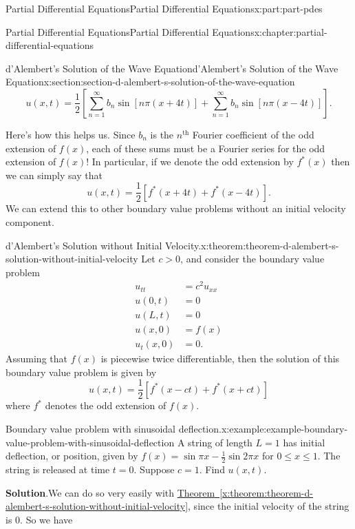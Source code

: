 \documentclass[oneside,10pt,]{book}
\newcommand{\blocktitlefont}{\relax}
\newcommand{\xreffont}{\relax}
\numberwithin{equation}{part}
\renewcommand{\th}{\text{th}}
\newcommand{\gt}{>}
\newcommand{\amp}{&}
\begin{document}
\begin{partptx}{Partial Differential Equations}{}{Partial Differential Equations}{}{}{x:part:part-pdes}
\begin{chapterptx}{Partial Differential Equations}{}{Partial Differential Equations}{}{}{x:chapter:partial-differential-equations}
\begin{sectionptx}{d'Alembert's Solution of the Wave Equation}{}{d'Alembert's Solution of the Wave Equation}{}{}{x:section:section-d-alembert-s-solution-of-the-wave-equation}
\begin{equation*}
u(x,t) = \frac{1}{2}\left[\sum_{n=1}^{\infty}b_{n}\sin[n\pi(x+4t)] + \sum_{n=1}^{\infty}b_{n}\sin[n\pi(x-4t)]\right].
\end{equation*}
%
\par
Here's how this helps us. Since \(b_{n}\) is the \(n^{\th}\) Fourier coefficient of the odd extension of \(f(x)\), each of these sums must be a Fourier series for the odd extension of \(f(x)\)! In particular, if we denote the odd extension by \(f^{*}(x)\) then we can simply say that%
%
\begin{equation*}
u(x,t) = \frac{1}{2}[f^{*}(x+4t)+f^{*}(x-4t)].
\end{equation*}
We can extend this to other boundary value problems without an initial velocity component.%
\begin{theorem}{d'Alembert's Solution without Initial Velocity.}{}{x:theorem:theorem-d-alembert-s-solution-without-initial-velocity}%
%
Let \(c\gt0\), and consider the boundary value problem%
%
\begin{align*}
u_{tt} \amp = c^{2}u_{xx} \\
u(0,t) \amp = 0 \\
u(L,t) \amp = 0 \\
u(x,0) \amp = f(x) \\
u_{t}(x,0) \amp = 0 \text{.}
\end{align*}
Assuming that \(f(x)\) is piecewise twice differentiable, then the solution of this boundary value problem is given by%
\begin{equation*}
u(x,t) = \frac{1}{2}[f^{*}(x-ct)+f^{*}(x+ct)]
\end{equation*}
where \(f^{*}\) denotes the odd extension of \(f(x)\).%
\end{theorem}
\begin{example}{Boundary value problem with sinusoidal deflection.}{x:example:example-boundary-value-problem-with-sinusoidal-deflection}%
A string of length \(L=1\) has initial deflection, or position, given by \(f(x) = \sin\pi x - \frac{1}{2}\sin2\pi x\) for \(0\leq x\leq 1\). The string is released at time \(t=0\). Suppose \(c=1\). Find \(u(x,t)\).%
\par\smallskip%
\noindent\textbf{\blocktitlefont Solution}.\hypertarget{g:solution:idp105548780913440}{}\quad{}We can do so very easily with \hyperref[x:theorem:theorem-d-alembert-s-solution-without-initial-velocity]{Theorem~{\xreffont\ref{x:theorem:theorem-d-alembert-s-solution-without-initial-velocity}}}, since the initial velocity of the string is \(0\). So we have%

\end{example}
\end{sectionptx}
\end{chapterptx}
\end{partptx}
\end{document}

